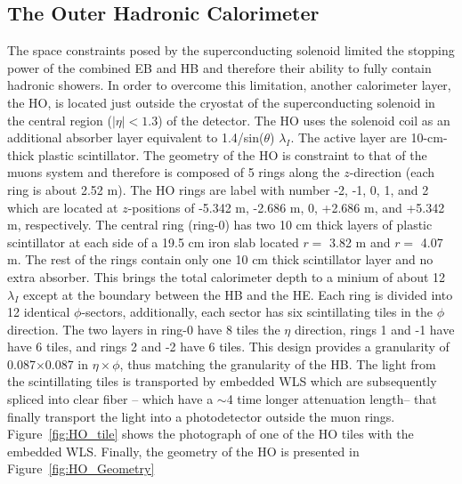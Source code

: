 \subsection{The Outer Hadronic Calorimeter}
The space constraints posed by the superconducting solenoid limited
the stopping power of the combined EB and HB and therefore their
ability to fully contain hadronic showers. In order to overcome this
limitation, another calorimeter layer, the HO, is located just outside the
cryostat of the superconducting solenoid in the central region
($|\eta| < 1.3$) of the detector. The HO uses the solenoid coil as an
additional absorber layer equivalent to 1.4/sin($\theta$)
$\lambda_{I}$. The active layer are 10-cm-thick plastic
scintillator. The geometry of the HO is constraint to that of the
muons system and therefore is composed of 5 rings along the
$z$-direction (each ring is about 2.52 m). The HO rings are label with
number -2, -1, 0, 1, and 2 which are located at $z$-positions of
-5.342 m, -2.686 m, 0, +2.686 m, and +5.342 m, respectively. The
central ring (ring-0) has two 10 cm thick layers of plastic
scintillator at each side of a 19.5 cm iron slab located $r =$ 3.82 m
and  $r =$ 4.07 m. The rest of the rings contain only one 10 cm thick
scintillator layer and no extra absorber. This brings the total
calorimeter depth to a minium of about 12 $\lambda_{I}$ except at the
boundary between the HB and the HE. Each ring is divided into 12
identical $\phi$-sectors, additionally, each sector has six scintillating tiles in
the $\phi$ direction. The two layers in ring-0 have 8 tiles the $\eta$ direction, rings 1
and -1 have have 6 tiles, and rings 2 and -2 have 6 tiles. This design
provides a granularity of 0.087$\times$0.087 in $\eta\times\phi$, thus
matching the granularity of the HB. The light from the scintillating
tiles is transported by embedded WLS which are subsequently spliced
into clear fiber -- which have a $\sim$4 time longer attenuation
length-- that finally transport the light into a photodetector outside
the muon rings. Figure~\ref{fig:HO_tile} shows the photograph of one
of the HO tiles with the embedded WLS. Finally, the geometry of the HO
is presented in Figure~\ref{fig:HO_Geometry}

